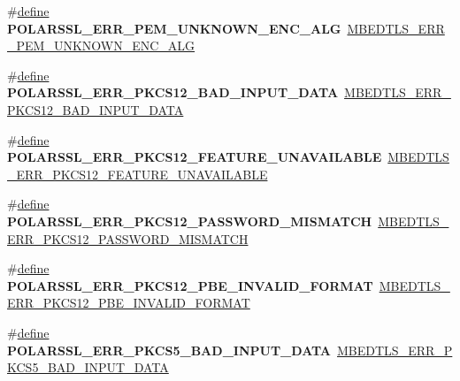 \begin{DoxyCompactItemize}
\#\hyperlink{structdefine}{define} {\bfseries P\+O\+L\+A\+R\+S\+S\+L\+\_\+\+E\+R\+R\+\_\+\+P\+E\+M\+\_\+\+U\+N\+K\+N\+O\+W\+N\+\_\+\+E\+N\+C\+\_\+\+A\+LG}~\hyperlink{pem_8h_a28b7a955389ec2e9a8b7a7d3f13ad746}{M\+B\+E\+D\+T\+L\+S\+\_\+\+E\+R\+R\+\_\+\+P\+E\+M\+\_\+\+U\+N\+K\+N\+O\+W\+N\+\_\+\+E\+N\+C\+\_\+\+A\+LG}
\item 
\mbox{\label{compat-1_83_8h_a0347624b3dbc3cbbb9bd7853247d2481}} 
\#\hyperlink{structdefine}{define} {\bfseries P\+O\+L\+A\+R\+S\+S\+L\+\_\+\+E\+R\+R\+\_\+\+P\+K\+C\+S12\+\_\+\+B\+A\+D\+\_\+\+I\+N\+P\+U\+T\+\_\+\+D\+A\+TA}~\hyperlink{pkcs12_8h_ac856f81d3cbc3baeaa848b33d991209b}{M\+B\+E\+D\+T\+L\+S\+\_\+\+E\+R\+R\+\_\+\+P\+K\+C\+S12\+\_\+\+B\+A\+D\+\_\+\+I\+N\+P\+U\+T\+\_\+\+D\+A\+TA}
\item 
\mbox{\label{compat-1_83_8h_a1f7e0b02bbbdbf57a8eaf833373a3532}} 
\#\hyperlink{structdefine}{define} {\bfseries P\+O\+L\+A\+R\+S\+S\+L\+\_\+\+E\+R\+R\+\_\+\+P\+K\+C\+S12\+\_\+\+F\+E\+A\+T\+U\+R\+E\+\_\+\+U\+N\+A\+V\+A\+I\+L\+A\+B\+LE}~\hyperlink{pkcs12_8h_ae887e38a4caab392fc5086bcceed7af9}{M\+B\+E\+D\+T\+L\+S\+\_\+\+E\+R\+R\+\_\+\+P\+K\+C\+S12\+\_\+\+F\+E\+A\+T\+U\+R\+E\+\_\+\+U\+N\+A\+V\+A\+I\+L\+A\+B\+LE}
\item 
\mbox{\label{compat-1_83_8h_ad616cb2d36ddaba56e5a2948ea7e667c}} 
\#\hyperlink{structdefine}{define} {\bfseries P\+O\+L\+A\+R\+S\+S\+L\+\_\+\+E\+R\+R\+\_\+\+P\+K\+C\+S12\+\_\+\+P\+A\+S\+S\+W\+O\+R\+D\+\_\+\+M\+I\+S\+M\+A\+T\+CH}~\hyperlink{pkcs12_8h_ab3313f9e7321d23b3af93e97a544ffdb}{M\+B\+E\+D\+T\+L\+S\+\_\+\+E\+R\+R\+\_\+\+P\+K\+C\+S12\+\_\+\+P\+A\+S\+S\+W\+O\+R\+D\+\_\+\+M\+I\+S\+M\+A\+T\+CH}
\item 
\mbox{\label{compat-1_83_8h_a0ff774a9a6812532a2d116e031f2215b}} 
\#\hyperlink{structdefine}{define} {\bfseries P\+O\+L\+A\+R\+S\+S\+L\+\_\+\+E\+R\+R\+\_\+\+P\+K\+C\+S12\+\_\+\+P\+B\+E\+\_\+\+I\+N\+V\+A\+L\+I\+D\+\_\+\+F\+O\+R\+M\+AT}~\hyperlink{pkcs12_8h_a92e9101410d452e508c88a7231e23996}{M\+B\+E\+D\+T\+L\+S\+\_\+\+E\+R\+R\+\_\+\+P\+K\+C\+S12\+\_\+\+P\+B\+E\+\_\+\+I\+N\+V\+A\+L\+I\+D\+\_\+\+F\+O\+R\+M\+AT}
\item 
\mbox{\label{compat-1_83_8h_a5779c8b6dc1e1046e852baf10d54dc2b}} 
\#\hyperlink{structdefine}{define} {\bfseries P\+O\+L\+A\+R\+S\+S\+L\+\_\+\+E\+R\+R\+\_\+\+P\+K\+C\+S5\+\_\+\+B\+A\+D\+\_\+\+I\+N\+P\+U\+T\+\_\+\+D\+A\+TA}~\hyperlink{pkcs5_8h_a12ca62fa36fecf6a6d9d9218601255f7}{M\+B\+E\+D\+T\+L\+S\+\_\+\+E\+R\+R\+\_\+\+P\+K\+C\+S5\+\_\+\+B\+A\+D\+\_\+\+I\+N\+P\+U\+T\+\_\+\+D\+A\+TA}

\end{DoxyCompactItemize}

